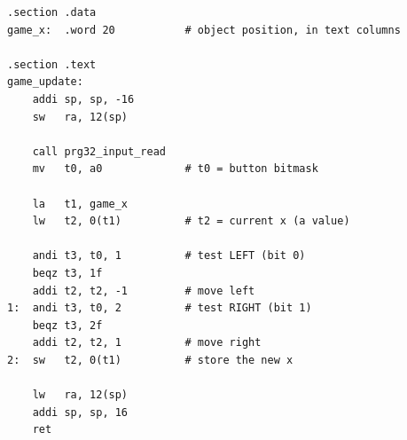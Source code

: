 \begin{lstlisting}[style=asm,caption={A full \code{update}: read input, move on LEFT/RIGHT, store the result. Compare with the platform's \code{pong\_ascii\_update}.}]
.section .data
game_x:  .word 20           # object position, in text columns

.section .text
game_update:
    addi sp, sp, -16
    sw   ra, 12(sp)

    call prg32_input_read
    mv   t0, a0             # t0 = button bitmask

    la   t1, game_x
    lw   t2, 0(t1)          # t2 = current x (a value)

    andi t3, t0, 1          # test LEFT (bit 0)
    beqz t3, 1f
    addi t2, t2, -1         # move left
1:  andi t3, t0, 2          # test RIGHT (bit 1)
    beqz t3, 2f
    addi t2, t2, 1          # move right
2:  sw   t2, 0(t1)          # store the new x

    lw   ra, 12(sp)
    addi sp, sp, 16
    ret
\end{lstlisting}